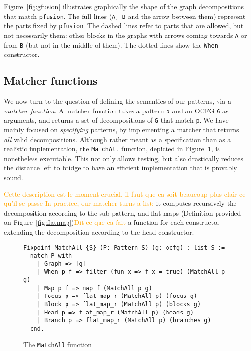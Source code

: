 \documentclass[11pt]{article}
\newcommand{\inlinecoq}[1]{\mbox{\lstinline[style=customcoq,columns=fixed,basewidth=.48em]{#1}}}
\newcommand{\ilc}[1]{\inlinecoq{#1}}
\newcommand{\gr}[1]{\textcolor{Orange}{#1}}
\newcommand{\yz}[1]{\textcolor{ForestGreen}{#1}}
\newcommand{\ocfg}{OCFG\xspace}
\begin{document}
Figure~\ref{fig:gfusion} illustrates graphically the shape of the graph decompositions that match \ilc{pfusion}. The full lines (\ilc{A, B} and the arrow between them) represent the parts fixed by \ilc{pfusion}. The dashed lines refer to parts that are allowed, but not necessarily them: other blocks in the graphs with arrows coming towards \ilc{A} or from \ilc{B} (but not in the middle of them). The dotted lines 
show the \ilc{When} constructor.

\subsection{Matcher functions}
\label{sec:matcher}

We now turn to the question of defining the semantics of our patterns, via a \emph{matcher function}. 
A matcher function takes a pattern \ilc{p} and an \ocfg{} \ilc{G} as arguments, and returns a set of decompositions of \ilc{G} that match \ilc{p}.
We have mainly focused on \emph{specifying} patterns, by implementing a matcher that returns \emph{all} valid decompositions. 
Although rather meant as a specification than as a realistic implementation, the \ilc{MatchAll} function, depicted in Figure~\ref{fig:matchall}, is nonetheless executable. This not only allows testing, but also drastically reduces the distance left to bridge to have an efficient implementation that is provably sound.

\gr{Cette description est le moment crucial, il faut que ca soit beaucoup plus
  clair ce qu'il se passe}
\gr{In practice, our matcher turns a list:}
it computes recursively the decomposition according to the sub-pattern, and flat maps (Definition provided on Figure~\ref{fig:flatmap})\gr{Dit ce que ca fait} a function for each constructor extending the decomposition according to the head constructor.

\begin{figure}
  \label{fig:match}
  \begin{lstlisting}[style=customcoq,basicstyle=\small\ttfamily]
Fixpoint MatchAll {S} (P: Pattern S) (g: ocfg) : list S :=
  match P with
    | Graph => [g]
    | When p f => filter (fun x => f x = true) (MatchAll p g) 
    | Map p f => map f (MatchAll p g)
    | Focus p => flat_map_r (MatchAll p) (focus g)
    | Block p => flat_map_r (MatchAll p) (blocks g)
    | Head p => flat_map_r (MatchAll p) (heads g)
    | Branch p => flat_map_r (MatchAll p) (branches g)
  end.
  \end{lstlisting}
  \caption{The \ilc{MatchAll} function}
  \label{fig:matchall}
\end{figure}
\end{document}
